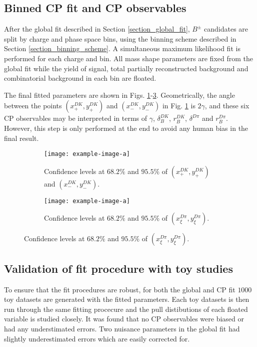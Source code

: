 \documentclass[12pt, a4paper, notitlepage, onecolumn]{article}
\numberwithin{equation}{section}
\begin{document}
\subsection{Binned CP fit and CP observables}
\noindent After the global fit described in Section \ref{section_global_fit}, $B^\pm$ candidates are split by charge and phase space bins, using the binning scheme described in Section \ref{section_binning_scheme}. A simultaneous maximum likelihood fit is performed for each charge and bin. All mass shape parameters are fixed from the global fit while the yield of signal, total partially reconstructed background and combinatorial background in each bin are floated.

The final fitted parameters are shown in Figs. \ref{fig_xpm_ypm}-\ref{fig_xxi_yxi}. Geometrically, the angle between the points $(x_+^{DK}, y_+^{DK})$ and $(x_-^{DK}, y_-^{DK})$ in Fig. \ref{fig_xpm_ypm} is $2\gamma$, and these six CP observables may be interpreted in terms of $\gamma$, $\delta_B^{DK}$, $r_B^{DK}$, $\delta^{D\pi}$ and $r_B^{D\pi}$. However, this step is only performed at the end to avoid any human bias in the final result.

\begin{figure}[H] 
  \centering
  \begin{subfigure}{0.5\textwidth}
    \centering
    \texttt{[image: example-image-a]}
    \caption{Confidence levels at $68.2\%$ and $95.5\%$ of $(x_+^{DK}, y_+^{DK})$ and $(x_-^{DK}, y_-^{DK})$.}
    \label{fig_xpm_ypm}
  \end{subfigure}%
  \begin{subfigure}{0.5\textwidth}
    \centering
    \texttt{[image: example-image-a]}
  \caption{Confidence levels at $68.2\%$ and $95.5\%$ of $(x_\xi^{D\pi}, y_\xi^{D\pi})$.}
    \label{fig_xxi_yxi}
  \end{subfigure}
\end{figure}

\subsection{Validation of fit procedure with toy studies}
\noindent To ensure that the fit procedures are robust, for both the global and CP fit $1000$ toy datasets are generated with the fitted parameters. Each toy datasets is then run through the same fitting procecure and the pull distibutions of each floated variable is studied closely. It was found that no CP observables were biased or had any understimated errors. Two nuisance parameters in the global fit had slightly underestimated errors which are easily corrected for.
\end{document}
